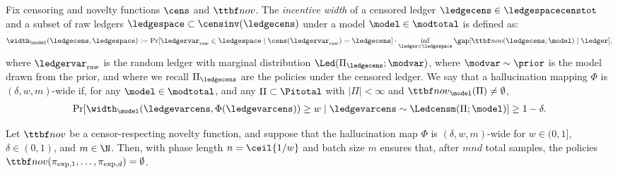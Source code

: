 \begin{definition}\label{def:width} Fix censoring and novelty functions $\cens$ and $\novel$.  The \emph{incentive width} of a censored ledger $\ledgecens \in \ledgespacecenstot$ and a subset of raw ledgers $\ledgespace\subset \censinv(\ledgecens)$ under a model $\model \in \modtotal$ is defined as:
\begin{align}
    \width_{\model}(\ledgecens,\ledgespace) := \Pr[ \ledgervar_{\mathrm{raw}} \in \ledgespace \mid \cens(\ledgervar_{\mathrm{raw}}) = \ledgecens] \cdot \inf_{\ledger \in \ledgespace } \gap[  \novel(\ledgecens;\model) \mid  \ledger],
\end{align}
where $\ledgervar_{\mathrm{raw}}$ is the random ledger with marginal distribution $\Led(\Pi_{\ledgecens};\modvar)$, where $\modvar \sim \prior$ is the model drawn from the prior, and where we recall $\Pi_{\ledgecens}$ are the policies under the censored ledger. We say that a hallucination mapping $\Phi$ is $(\delta,w,m)$-wide if, for any $\model \in \modtotal$, and any $\Pi \subset \Pitotal$ with $|\Pi| < \infty$ and $\novel_{\model}(\Pi) \ne \emptyset$,
\begin{align*} 
\Pr[  \width_{\model}(\ledgevarcens,\Phi(\ledgevarcens)) \ge w \mid \ledgevarcens \sim \Ledcensm(\Pi;\model) ] \ge 1 - \delta.
\end{align*}
\end{definition}



\newcommand{\piexpl}[1][\ell]{\pi_{\mathrm{exp},#1}}



\begin{theorem}\label{thm:meta-theorem} Let $\novel$ be a censor-respecting novelty function, and suppose that the hallucination map $\Phi$ is $(\delta,w,m)$-wide for $w \in (0,1]$, $\delta \in (0,1)$, and $m \in \N$. Then,  with phase length $n = \ceil{1/w}$ and batch size $m$ ensures that, after $m n d$ total samples, the policies $\novel(\piexpl[1],\dots,\piexpl[d]) = \emptyset$. 
\end{theorem}

